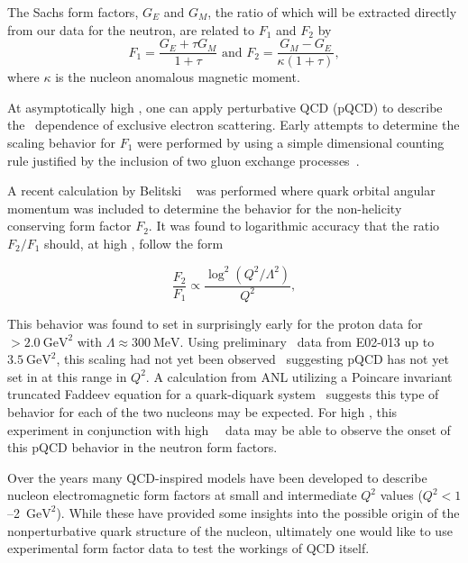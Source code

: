 The Sachs form factors, $G_E$ and $G_M$, the ratio of which will be extracted directly from our data for the neutron, are related to $F_1$ and $F_2$ by
%
\begin{equation}
F_{1} = \frac{G_{E} + \tau G_{M}}{1+\tau} \mbox{  and  }
F_{2} = \frac{G_{M} - G_{E}}{\kappa (1+\tau)},
\label{eq:f1f2}
\end{equation}
%
where $\kappa$ is the nucleon anomalous magnetic moment.

At asymptotically high \qsq, one can apply perturbative QCD (pQCD) to describe the \qsq~dependence of exclusive electron scattering.
Early attempts to determine the scaling behavior for $F_1$ were performed  by using a simple dimensional counting
rule justified by the inclusion of two gluon exchange processes~\cite{brodsky,brodlep}.

A recent calculation by Belitski \etal~\cite{belitsky} was performed where quark orbital angular momentum was included to determine 
the behavior for the non-helicity conserving form factor $F_2$.  
It was found to logarithmic accuracy that the ratio $F_2/F_1$ should, at high \qsq, follow the form

\begin{equation}
\frac{F_2}{F_1} \propto \frac{ \log^2\left(Q^2/\Lambda^2\right) }{Q^2},
\end{equation} 

This behavior was found to set in surprisingly early for the proton data for \qsq $> 2.0~\mathrm{GeV}^2$ with $\Lambda \approx 300~\mathrm{MeV}$.  
Using preliminary \gen~data from E02-013 up to $3.5~\mathrm{GeV}^2$, this scaling had not yet been observed~\cite{riordan} suggesting pQCD has not yet set in at this range in $Q^2$.  
A calculation from ANL utilizing a Poincare invariant truncated Faddeev equation for a quark-diquark system~\cite{bhagwat} suggests this type of behavior for each of the two nucleons may be expected.  
For high \qsq, this experiment in conjunction with high \qsq~\gmn~data may be able to observe the onset of this pQCD behavior in the neutron form factors.
%

Over the years many QCD-inspired models have been developed to describe nucleon electromagnetic form factors at small and intermediate $Q^2$
values ($Q^2 < 1$--2~$\mathrm{GeV}^2$).
While these have provided some insights into the possible origin of the nonperturbative quark structure of the nucleon, ultimately one would like
to use experimental form factor data to test the workings of QCD itself.
%

